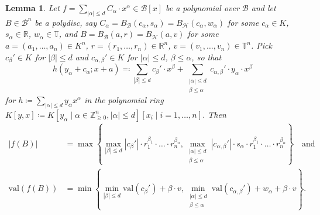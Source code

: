 \documentclass[10pt,a4paper]{amsart}
\newtheorem{lemma}{Lemma}
\newcommand{\RR}{\mathbb{R}}
\newcommand{\TT}{\mathbb{T}}
\newcommand{\ZZ}{\mathbb{Z}}
\newcommand{\val}{{\mathrm{val}}}
\begin{document}
\begin{lemma}
  \label{lem:formula}
  Let $f=\sum_{|\alpha|\leq d} C_\alpha\cdot x^\alpha\in \mathcal B[x]$ be a polynomial over $\mathcal B$ and let $B\in\mathcal B^n$ be a polydisc, say $C_\alpha=B_{\mathcal{B}}(c_\alpha,s_\alpha)=B_{\mathcal{H}}(c_\alpha,w_\alpha)$ for some $c_\alpha\in K$, $s_{\alpha}\in\RR$, $w_\alpha\in\TT$, and $B=B_{\mathcal{B}}(a,r)=B_{\mathcal{H}}(a,v)$ for some $a=(a_1,\dots,a_n)\in K^n$, $r=(r_1,\dots,r_n)\in\RR^n$, $v=(v_1,\dots,v_n)\in \TT^n$.
  Pick $c_\beta'\in K$ for $|\beta|\leq d$ and $c_{\alpha,\beta}'\in K$ for $|\alpha|\leq d$, $\beta\leq\alpha$, so that
  \begin{equation}
      \label{eq:formula}
      h(y_\alpha+c_\alpha; x+a) \eqqcolon 
      \sum_{|\beta|\leq d} c_{\beta}'\cdot x^\beta + \sum_{\substack{|\alpha|\leq d\\ \beta\leq\alpha}} c_{\alpha,\beta}'\cdot y_\alpha\cdot x^\beta  
  \end{equation}
  for $h\coloneqq \sum_{|\alpha|\leq d} y_\alpha x^\alpha$ in the polynomial ring $K[y,x]\coloneqq K[y_\alpha\mid \alpha\in\ZZ_{\geq 0}^n, |\alpha|\leq d][x_i\mid i=1,\dots,n]$.  Then
  \begin{align*}
    |f(B)| &= \max\left\{
      \max_{|\beta|\leq d} |c_\beta'|\cdot r_1^{\beta_1}\cdot \ldots\cdot r_n^{\beta_n},
      \max_{\substack{|\alpha|\leq d\\ \beta \le \alpha}} |c_{\alpha,\beta}'|\cdot s_\alpha\cdot r_1^{\beta_1}\cdot \ldots\cdot r_n^{\beta_n}
    \right\} \quad \text{and}\\
    \val(f(B)) &= \min\left\{
      \min_{|\beta|\leq d} \val(c_\beta') + \beta\cdot v,
      \min_{\substack{|\alpha|\leq d\\ \beta \le \alpha}} \val(c_{\alpha,\beta}') + w_\alpha + \beta\cdot v
    \right\}.
  \end{align*}
\end{lemma}
\end{document}
